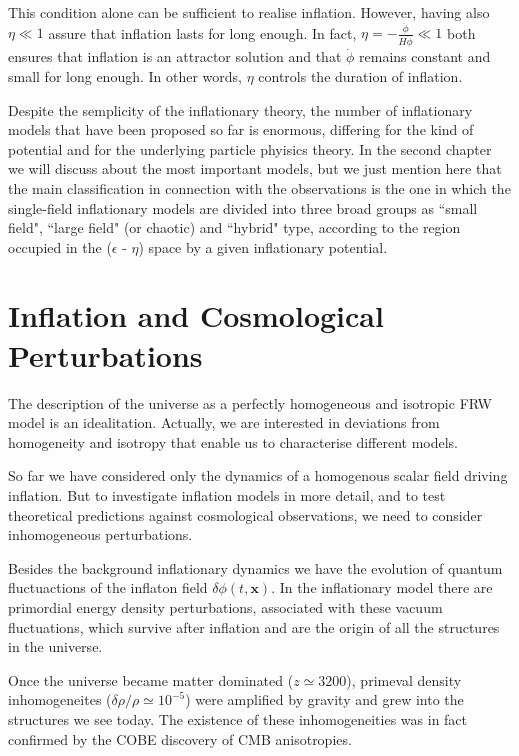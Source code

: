 \documentclass[11pt,a4paper,twoside]{book}
\begin{document}
This condition alone can be sufficient to realise inflation. However, having also $\eta \ll 1 $  assure that inflation lasts for long enough. In fact, $ \eta = - \frac{\ddot{\phi}}{H\dot{\phi}}  \ll 1 $ both ensures that inflation is an attractor solution and that $\dot{\phi}$ remains constant and small for long enough. In other words, $\eta$ controls the duration of inflation.

Despite the semplicity of the inflationary theory, the number of inflationary models that have been proposed so far is enormous, differing for the kind of potential and for the underlying particle phyisics theory. In the second chapter we will discuss about the most important models, but we just  mention here that the main classification in connection with the observations is the one in which the single-field inflationary models are divided into three broad groups as \textquotedblleft small field", \textquotedblleft large field" (or chaotic) and \textquotedblleft hybrid" type, according to the region occupied in the ($\epsilon$ - $\eta$) space by a given inflationary potential.

\section{Inflation and Cosmological Perturbations}
The description of the universe as a perfectly homogeneous and isotropic FRW model is an idealitation. Actually, we are interested in deviations from homogeneity and isotropy that enable us to characterise different models.

So far we have considered only the dynamics of a homogenous scalar field driving inflation. But to investigate inflation models in more detail, and to test theoretical predictions against cosmological observations, we need to consider inhomogeneous perturbations. 

Besides the background inflationary dynamics we have the evolution of  quantum fluctuactions of the inflaton field $ \delta\phi(t,\textbf{x}) $. In the inflationary model there are primordial energy density perturbations, associated with these vacuum fluctuations, which survive after inflation and are the origin of all the structures in the universe.

Once the universe became matter dominated ($ z \simeq 3200 $), primeval density inhomogeneites ($ \delta \rho/\rho \simeq 10^{-5} $) were amplified by gravity and grew into the structures we see today. The existence of these inhomogeneities was in fact confirmed by the COBE discovery of CMB anisotropies.
\end{document}
